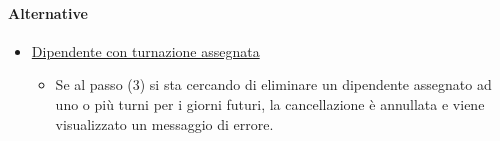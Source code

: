 \paragraph{Alternative}
\begin{itemize}
	\item \underline{Dipendente con turnazione assegnata}
		\begin{itemize}
			\item Se al passo (3) si sta cercando di eliminare un dipendente assegnato ad uno o più turni per i giorni futuri, la cancellazione è annullata e viene visualizzato un messaggio di errore. 
		\end{itemize}
\end{itemize}